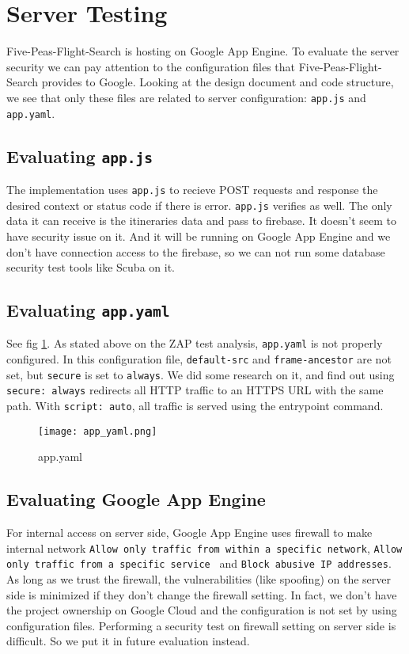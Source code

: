 \documentclass[12pt, a4paper]{article}
\newcommand{\code}[1]{\texttt{#1}}
\begin{document}
\section{Server Testing}
Five-Peas-Flight-Search is hosting on Google App Engine. To evaluate the server security we can pay attention to the configuration files that Five-Peas-Flight-Search provides to Google. Looking at the design document and code structure, we see that only these files are related to server configuration: \code{app.js} and \code{app.yaml}.

\subsection{Evaluating \code{app.js}}
The implementation uses \code{app.js} to recieve POST requests and response the desired context or status code if there is error. \code{app.js} verifies as well. The only data it can receive is the itineraries data and pass to firebase. It doesn't seem to have security issue on it. And it will be running on Google App Engine and we don't have connection access to the firebase, so we can not run some database security test tools like Scuba on it.

\subsection{Evaluating \code{app.yaml}}
See fig \ref{fig:app.yaml}. As stated above on the ZAP test analysis, \code{app.yaml} is not properly configured. In this configuration file, \code{default-src} and \code{frame-\linebreak[1] ancestor} are not set, but \code{secure} is set to \code{always}.
We did some research on it, and find out using \code{secure: always} redirects all HTTP traffic to an HTTPS URL with the same path. With \code{script: auto}, all traffic is served using the entrypoint command.


\begin{figure}[ht]
\centering
\texttt{[image: app\_yaml.png]}
\caption{app.yaml}
\label{fig:app.yaml}
\end{figure}

\subsection{Evaluating Google App Engine}
For internal access on server side, Google App Engine uses firewall to make internal network \code{Allow only traffic from within a specific network}, \code{Allow only traffic from a specific service
} and \code{Block abusive IP addresses}. As long as we trust 
the firewall, the vulnerabilities (like spoofing) on the server side is minimized if they don't change the firewall setting. In fact, we don't have the project ownership on Google Cloud and the configuration is not set by using configuration files. Performing a security test on firewall setting on server side is difficult. So we put it in future evaluation instead.
\end{document}

